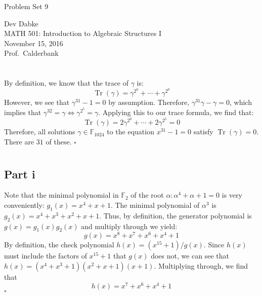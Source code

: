 \documentclass[letterpaper]{article}
\newcommand*{\QED}{\hfill\ensuremath{\square}}%
\DeclareMathOperator{\tr}{Tr}
\def\name{Problem Set 9}
\begin{document}
{\huge \name}


\vspace{0.25in}

Dev Dabke \\
MATH 501: Introduction to Algebraic Structures I \\
November 15, 2016 \\
Prof.\ Calderbank \\

\section{}
\label{sec:Question1}

By definition, we know that the trace of $ \gamma $ is:
\[
\tr{(\gamma)} = \gamma^{2^0} + \cdots + \gamma^{2^9}
\]
However, we see that $ \gamma^{31} - 1 = 0 $ by assumption.
Therefore, $ \gamma^{31} \gamma - \gamma = 0 $, which implies that $ \gamma^{32} = \gamma \iff \gamma^{2^{5}} = \gamma $.
Applying this to our trace formula, we find that:
\[
\tr{(\gamma)} = 2 \gamma^{2^0} + \cdots + 2 \gamma^{2^5} = 0
\]
Therefore, all solutions $ \gamma \in \mathbb{F}_{1024} $ to the equation $ x^{31} - 1 = 0 $ satisfy $ \tr{(\gamma)} = 0 $.
There are $ 31 $ of these.
\QED{}

\section{}
\label{sec:Question2}

\subsection{Part i}
\label{subs:2Parti}

Note that the minimal polynomial in $ \mathbb{F}_2 $ of the root $ \alpha : \alpha^4 + \alpha + 1 = 0 $ is very conveniently: $ g_1(x) = x^4 + x + 1 $.
The minimal polynomial of $ \alpha^3 $ is $ g_2(x) = x^4 + x^3 + x^2 + x + 1 $.
Thus, by definition, the generator polynomial is $ g(x) = g_1(x)g_2(x) $ and multiply through we yield:
\[
g(x) = x^8 + x^7 + x^6 + x^4 + 1
\]
By definition, the check polynomial $ h(x) = (x^{15} + 1) / g(x) $.
Since $ h(x) $ must include the factors of $ x^{15} + 1 $ that $ g(x) $ does not, we can see that $ h(x) = (x^4 + x^3 + 1)(x^2 + x + 1)(x + 1) $.
Multiplying through, we find that
\[
h(x) = x^7 + x^6 + x^4 + 1
\]
\QED{}
\end{document}
